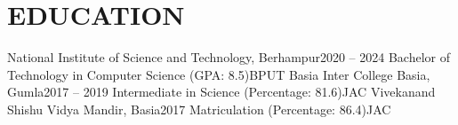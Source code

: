 \section{EDUCATION}
    \resumeSubHeadingListStart

    \resumeSubheading
    {National Institute of Science and Technology, Berhampur}{2020 -- 2024}
    {Bachelor of Technology in Computer Science (GPA: 8.5)}{BPUT}
    \resumeSubheading
    {Basia Inter College Basia, Gumla}{2017 -- 2019}
    {Intermediate in Science (Percentage: 81.6)}{JAC}
    \resumeSubheading
    {Vivekanand Shishu Vidya Mandir, Basia}{2017}
    {Matriculation (Percentage: 86.4)}{JAC}
    \resumeSubHeadingListEnd